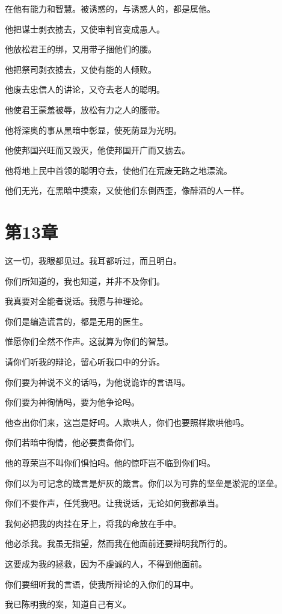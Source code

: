 \documentclass[12pt,oneside]{book}
\begin{document}
在他有能力和智慧。被诱惑的，与诱惑人的，都是属他。

他把谋士剥衣掳去，又使审判官变成愚人。

他放松君王的绑，又用带子捆他们的腰。

他把祭司剥衣掳去，又使有能的人倾败。

他废去忠信人的讲论，又夺去老人的聪明。

他使君王蒙羞被辱，放松有力之人的腰带。

他将深奥的事从黑暗中彰显，使死荫显为光明。

他使邦国兴旺而又毁灭，他使邦国开广而又掳去。

他将地上民中首领的聪明夺去，使他们在荒废无路之地漂流。

他们无光，在黑暗中摸索，又使他们东倒西歪，像醉酒的人一样。



\chapter{第13章}
这一切，我眼都见过。我耳都听过，而且明白。

你们所知道的，我也知道，并非不及你们。

我真要对全能者说话。我愿与神理论。

你们是编造谎言的，都是无用的医生。

惟愿你们全然不作声。这就算为你们的智慧。

请你们听我的辩论，留心听我口中的分诉。

你们要为神说不义的话吗，为他说诡诈的言语吗。

你们要为神徇情吗，要为他争论吗。

他查出你们来，这岂是好吗。人欺哄人，你们也要照样欺哄他吗。

你们若暗中徇情，他必要责备你们。

他的尊荣岂不叫你们惧怕吗。他的惊吓岂不临到你们吗。

你们以为可记念的箴言是炉灰的箴言。你们以为可靠的坚垒是淤泥的坚垒。

你们不要作声，任凭我吧。让我说话，无论如何我都承当。

我何必把我的肉挂在牙上，将我的命放在手中。

他必杀我。我虽无指望，然而我在他面前还要辩明我所行的。

这要成为我的拯救，因为不虔诚的人，不得到他面前。

你们要细听我的言语，使我所辩论的入你们的耳中。

我已陈明我的案，知道自己有义。
\end{document}
